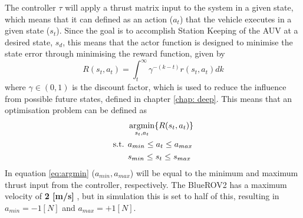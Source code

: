 The controller $\tau$ will apply a thrust matrix input to the system in a given state, which means that it can defined as an action ($a_{t}$) that the vehicle executes in a given state ($s_{t}$). Since the goal is to accomplish Station Keeping of the AUV at a desired state, ${s}_{d}$, this means that the actor function is designed to minimise the state error through minimising the reward function, given by
\begin{equation}
    R(s_{t}, a_{t}) = \int_{t}^{\infty} \gamma^{-(k-t)}r(s_{t},a_{t})dk
\end{equation}
where $\gamma \in (0, 1)$ is the discount factor, which is used to reduce the influence from possible future states, defined in chapter \ref{chap: deep}. This means that an optimisation problem can be defined as
\begin{align}
    & \operatorname*{argmin}_{s_{t}, a_{t}} \{ R(s_{t}, a_{t})\} \\
    \text{s.t. } & a_{min} \leq a_{t} \leq a_{max} \\
    & s_{min} \leq s_{t} \leq s_{max}
    \label{eq:argmin}
\end{align}
In equation \ref{eq:argmin} ($a_{min}, a_{max}$) will be equal to the minimum and maximum thrust input from the controller, respectively. The BlueROV2 has a maximum velocity of \textbf{2 [m/s]} \cite{blue}, but in simulation this is set to half of this, resulting in $a_{min} = -1 [N]$ and $a_{max} = +1 [N]$.
